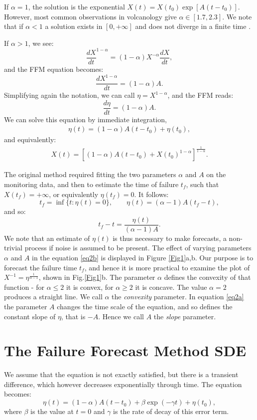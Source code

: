 \documentclass{article}
\begin{document}
If $\alpha=1$, the solution is the exponential $X(t)=X(t_0)\exp[A(t-t_0)]$. However, most common observations in volcanology give $\alpha\in[1.7,2.3]$. We note that if $\alpha<1$ a solution exists in $[0,+\infty]$ and does not diverge in a finite time \citep{Cornelius1995}.

If $\alpha > 1$, we see:
$$\frac{dX}{dt}^{1-\alpha}=(1-\alpha)X^{-\alpha}\frac{dX}{dt},$$
and the FFM equation becomes:
$$\frac{dX^{1-\alpha}}{dt}=(1-\alpha)A.$$
Simplifying again the notation, we can call $\eta=X^{1-\alpha}$, and the FFM reads:
$$\frac{d\eta}{dt}=(1-\alpha)A.$$
We can solve this equation by immediate integration,
\begin{align}\label{eq2a}
\eta(t)=(1-\alpha)A(t-t_0)+\eta(t_0),
\end{align}
and equivalently:
\begin{align}\label{eq2b}
X(t)=\left[(1-\alpha)A(t-t_0)+X(t_0)^{1-\alpha}\right]^{\frac{1}{1-\alpha}}.
\end{align}

The original method required fitting the two parameters $\alpha$ and $A$ on the monitoring data, and then to estimate the time of failure $t_f$, such that $X(t_f) =+\infty$, or equivalently $\eta(t_f)=0$. It follows:
$$t_f=\inf\{t:\eta(t)=0\}, \quad\quad \eta(t)=(\alpha-1)A(t_f-t),$$
and so:
$$t_f-t=\frac{\eta(t)}{(\alpha-1)A}.$$
We note that an estimate of $\eta(t)$ is thus necessary to make forecasts, a non-trivial process if noise is assumed to be present.
The effect of varying parameters $\alpha$ and $A$ in the equation \ref{eq2b} is displayed in Figure \ref{Fig1}a,b. Our purpose is to forecast the failure time $t_f$, and hence it is more practical to examine the plot of $X^{-1}=\eta^{\frac{1}{\alpha-1}}$, shown in Fig.\ref{Fig1}b. The parameter $\alpha$ defines the convexity of that function - for $\alpha\le2$ it is convex, for $\alpha\ge2$ it is concave. The value $\alpha=2$ produces a straight line. We call $\alpha$ the {\it convexity} parameter. In equation \ref{eq2a} the parameter $A$ changes the time scale of the equation, and so defines the constant slope of $\eta$, that is $-A$. Hence we call $A$ the {\it slope} parameter.

\section{The Failure Forecast Method SDE}\label{s2}
We assume that the equation is not exactly satisfied, but there is a transient difference, which however decreases exponentially through time. The equation becomes:
$$\eta(t)=(1-\alpha)A(t-t_0) +\beta\exp(-\gamma t)+\eta(t_0),$$
where $\beta$ is the value at $t=0$ and $\gamma$ is the rate of decay of this error term.
\end{document}
